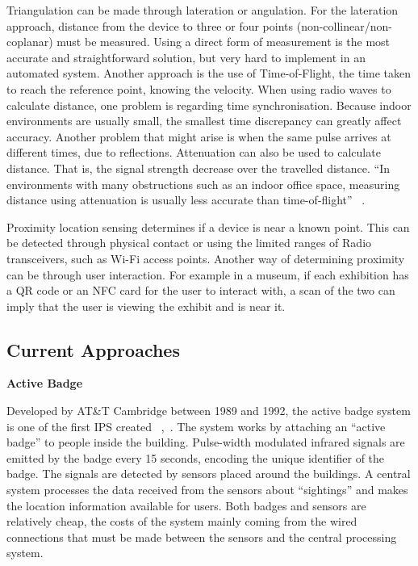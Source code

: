 Triangulation can be made through lateration or angulation. For the lateration approach, distance from the device to three or four points (non-collinear/non-coplanar) must be measured. Using a direct form of measurement is the most accurate and straightforward solution, but very hard to implement in an automated system. Another approach is the use of Time-of-Flight, the time taken to reach the reference point, knowing the velocity. When using radio waves to calculate distance, one problem is regarding time synchronisation. Because indoor environments are usually small, the smallest time discrepancy can greatly affect accuracy. Another problem that might arise is when the same pulse arrives at different times, due to reflections. Attenuation can also be used to calculate distance. That is, the signal strength decrease over the travelled distance. “In environments with many obstructions such as an indoor office space, measuring distance using attenuation is usually less accurate than time-of-flight” ~\cite{Hightower}.

Proximity location sensing determines if a device is near a known point. This can be detected through physical contact or using the limited ranges of Radio transceivers, such as Wi-Fi access points. Another way of determining proximity can be through user interaction. For example in a museum, if each exhibition has a QR code or an NFC card for the user to interact with, a scan of the two can imply that the user is viewing the exhibit and is near it.
\subsection{Current Approaches}

\noindent \textbf{Active Badge}

Developed by AT\&T Cambridge between 1989 and 1992, the active badge system is one of the first IPS created ~\cite{Want},~\cite{ActiveBadge}. The system works by attaching an “active badge” to people inside the building. Pulse-width modulated infrared signals are emitted by the badge every 15 seconds, encoding the unique identifier of the badge. The signals are detected by sensors placed around the buildings. A central system processes the data received from the sensors about “sightings” and makes the location information available for users. Both badges and sensors are relatively cheap, the costs of the system mainly coming from the wired connections that must be made between the sensors and the central processing system. 

